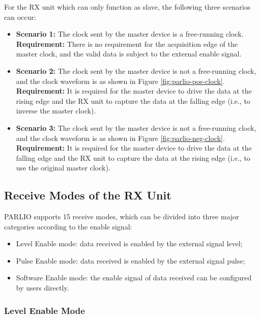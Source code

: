 \documentclass[main\_\_EN.tex]{subfiles}
\begin{document}
For the RX unit which can only function as slave, the following three scenarios can occur:
\begin{itemize}
    \item \textbf{Scenario 1:} The clock sent by the master device is a free-running clock. \\
    \textbf{Requirement:} There is no requirement for the acquisition edge of the master clock, and the valid data is subject to the external enable signal.
    \item \textbf{Scenario 2:} The clock sent by the master device is not a free-running clock, and the clock waveform is as shown in Figure \ref{fig:parlio-pos-clock}. \\
    \textbf{Requirement:} It is required for the master device to drive the data at the rising edge and the RX unit to capture the data at the falling edge (i.e., to inverse the master clock).
    \item \textbf{Scenario 3:} The clock sent by the master device is not a free-running clock, and the clock waveform is as shown in Figure \ref{fig:parlio-neg-clock}. \\
    \textbf{Requirement:} It is required for the master device to drive the data at the falling edge and the RX unit to capture the data at the rising edge (i.e., to use the original master clock).
\end{itemize}

\subsection{Receive Modes of the RX Unit}

PARLIO supports 15 receive modes, which can be divided into three major categories according to the enable signal:

\begin{itemize}
    \item Level Enable mode: data received is enabled by the external signal level;
    \item Pulse Enable mode: data received is enabled by the external signal pulse; 
    \item Software Enable mode: the enable signal of data received can be configured by users directly.
\end{itemize}

\subsubsection{Level Enable Mode}
\end{document}
